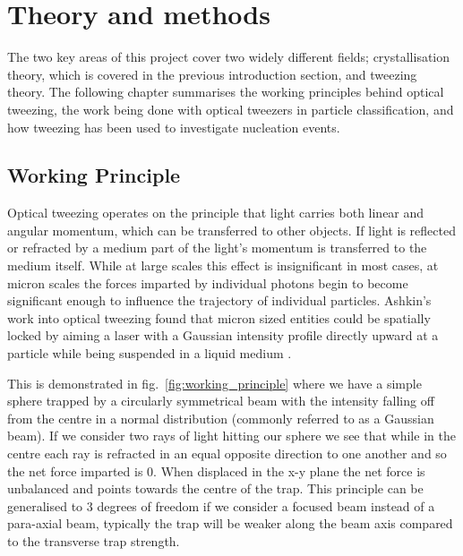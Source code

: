 \chapter{Theory and methods}
\label{chapter:theory}
The two key areas of this project cover two widely different fields; 
crystallisation theory, which is covered in the previous introduction 
section, and tweezing theory. The following chapter summarises the 
working principles behind optical tweezing, the work being done with 
optical tweezers in particle classification, and how tweezing has been 
used to investigate nucleation events. 

\section{Working Principle}

Optical tweezing operates on the principle that light carries both
linear and angular momentum, which can be transferred to other
objects. If light is reflected or refracted by a medium part of the
light's momentum is transferred to the medium itself. While at large
scales this effect is insignificant in most cases, at micron scales
the forces imparted by individual photons begin to become significant
enough to influence the trajectory of individual particles. Ashkin's 
work into optical tweezing found that micron sized entities could be 
spatially locked by aiming a laser with a Gaussian intensity profile 
directly upward at a particle while being suspended in a liquid 
medium \cite{Ashkin1970}. 

This is demonstrated in fig.~\ref{fig:working_principle} where we have 
a simple sphere trapped by a circularly symmetrical beam with the intensity
falling off from the centre in a normal distribution (commonly referred to
as a Gaussian beam). If we consider two rays of light hitting our sphere 
we see that while in the centre each ray is refracted in an equal opposite 
direction to one another and so the net force imparted is 0. When displaced 
in the x-y plane the net force is unbalanced and points towards the centre 
of the trap. This principle can be generalised to 3 degrees of freedom if we 
consider a focused beam instead of a para-axial beam, typically the trap will be
weaker along the beam axis compared to the transverse trap strength.


